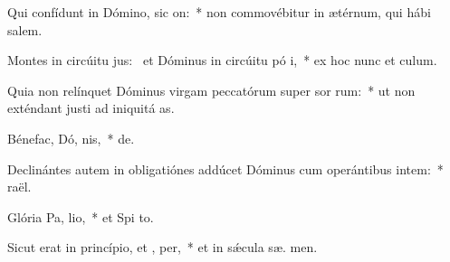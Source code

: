 \item Qui confídunt in Dómino, sic  on:~* non commovébitur in ætérnum, qui hábi  salem.
\item Montes in circúitu jus:~\pscross{} et Dóminus in circúitu pó i,~* ex hoc nunc et   culum.
\item Quia non relínquet Dóminus virgam peccatórum super sor rum:~* ut non exténdant justi ad iniquitá  as.
\item Bénefac, Dó, nis,~*   de.
\item Declinántes autem in obligatiónes addúcet Dóminus cum operántibus intem:~*   raël.
\item Glória Pa,  lio,~* et Spi to.
\item Sicut erat in princípio, et ,  per,~* et in sǽcula sæ. men.

